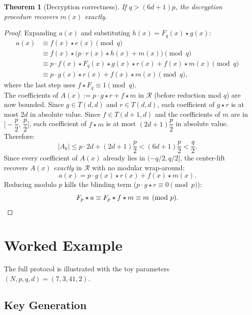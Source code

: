 \documentclass[12pt, a4paper]{article}
\theoremstyle{definition}
\theoremstyle{plain}
\newtheorem{theorem}{Theorem}[section]
\newcommand{\R}{\mathcal{R}}
\begin{document}
\begin{theorem}[Decryption correctness]\label{thm:correctness}
    If $q > (6d+1)p$, the decryption procedure recovers $m(x)$ exactly.
\end{theorem}

\begin{proof}
Expanding $a(x)$ and substituting $h(x) = F_q(x) \star g(x)$:
\begin{align*}
    a(x) &\equiv f(x) \star e(x) \pmod{q} \\
         &\equiv f(x) \star \bigl(p \cdot r(x) \star h(x) + m(x)\bigr) \pmod{q} \\
         &\equiv p \cdot f(x) \star F_q(x) \star g(x) \star r(x)
              + f(x) \star m(x) \pmod{q} \\
         &\equiv p \cdot g(x) \star r(x) + f(x) \star m(x) \pmod{q},
\end{align*}
where the last step uses $f \star F_q \equiv 1 \pmod{q}$.\\

The coefficients of $A(x) := p \cdot g \star r + f \star m$ in
$\R$ (before reduction mod $q$) are now bounded. Since $g \in T(d,d)$ and $r \in T(d,d)$,
each coefficient of $g \star r$ is at most $2d$ in absolute value. Since
$f \in T(d+1,d)$ and the coefficients of $m$ are in
$\bigl[-\dfrac{p}{2},\, \dfrac{p}{2}\bigr]$, each coefficient of
$f \star m$ is at most $(2d+1)\dfrac{p}{2}$ in absolute value. Therefore:
\[
    |A_k| \le p \cdot 2d + (2d+1)\dfrac{p}{2} < (6d+1)\dfrac{p}{2} < \dfrac{q}{2}.
\]
Since every coefficient of $A(x)$ already lies in $(-q/2, q/2]$, the
center-lift recovers $A(x)$ \textit{exactly} in $\R$ with no modular wrap-around:
\[
    a(x) = p \cdot g(x) \star r(x) + f(x) \star m(x).
\]
Reducing modulo $p$ kills the blinding term ($p \cdot g \star r \equiv 0 \pmod{p}$):
\[
    F_p \star a \equiv F_p \star f \star m \equiv m \pmod{p}. \qedhere
\]
\end{proof}

\section{Worked Example}

The full protocol is illustrated with the toy parameters $(N, p, q, d) = (7, 3, 41, 2)$.

\subsection{Key Generation}
\end{document}
